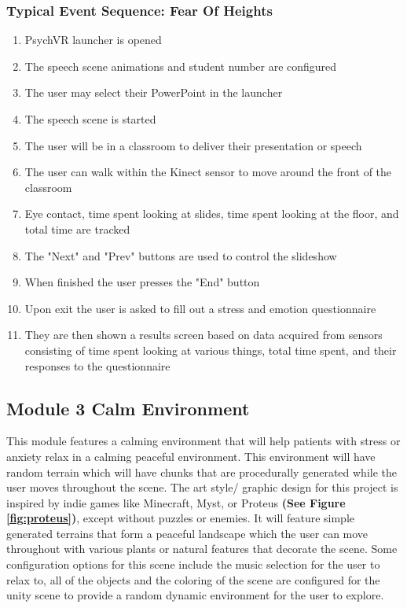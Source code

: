 \documentclass[a4paper,10pt]{article}
\begin{document}
\subsubsection{Typical Event Sequence: Fear Of Heights}
\begin{enumerate}
	\item PsychVR launcher is opened
	\item The speech scene animations and student number are configured
	\item The user may select their PowerPoint in the launcher
	\item The speech scene is started
	\item The user will be in a classroom to deliver their presentation or speech
	\item The user can walk within the Kinect sensor to move around the front of the classroom
	\item Eye contact, time spent looking at slides, time spent looking at the floor, and total time are tracked
	\item The "Next" and "Prev" buttons are used to control the slideshow
	\item When finished the user presses the "End" button
	\item Upon exit the user is asked to fill out a stress and emotion questionnaire
	\item They are then shown a results screen based on data acquired from sensors consisting of time spent looking at various things, total time spent, and their responses to the questionnaire
\end{enumerate}
\pagebreak
\subsection{Module 3 Calm Environment}
This module features a calming environment that will help patients with stress or anxiety relax in a calming peaceful environment. This environment will have random terrain which will have chunks that are procedurally generated while the user moves throughout the scene.  The art style/ graphic design for this project is inspired by indie games like Minecraft, Myst, or Proteus \textbf{(See Figure \ref{fig:proteus})}, except without puzzles or enemies. It will feature simple generated terrains that form a  peaceful landscape which the user can move throughout with various plants or natural features that decorate the scene.  Some configuration options for this scene include the music selection for the user to relax to, all of the objects and the coloring of the scene are configured for the unity scene to provide a random dynamic environment for the user to explore.
\end{document}

